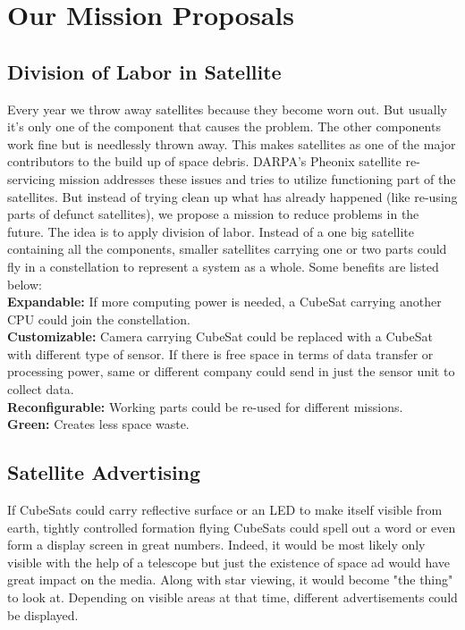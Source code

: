 \section{Our Mission Proposals}

\subsection{Division of Labor in Satellite}
\label{labour}
Every year we throw away satellites because they become worn out. But usually it's only one of the component that causes the problem. The other components work fine but is needlessly thrown away. This makes satellites as one of the major contributors to the build up of space debris. DARPA's Pheonix satellite re-servicing mission addresses these issues and tries to utilize functioning part of the satellites. But instead of trying clean up what has already happened (like  re-using parts of defunct satellites), we propose a mission to reduce problems in the future. The idea is to apply division of labor. Instead of a one big satellite containing all the components, smaller satellites carrying one or two parts could fly in a constellation to represent a system as a whole. Some benefits are listed below: \\

{\bf Expandable:} If more computing power is needed, a CubeSat carrying another CPU could join the constellation. \\
 
{\bf Customizable:} Camera carrying CubeSat could be replaced with a CubeSat with different type of sensor.
If there is free space in terms of data transfer or processing power, same or different company could send in just the sensor unit to collect data. \\

{\bf Reconfigurable:} Working parts could be re-used for different missions.\\

{\bf Green:} Creates less space waste.

\subsection{Satellite Advertising}
\label{ad}
If CubeSats could carry reflective surface or an LED to make itself visible from earth, tightly controlled formation flying CubeSats could spell out a word or even form a display screen in great numbers. Indeed, it would be most likely only visible with the help of a telescope but just the existence of space ad would have great impact on the media. Along with star viewing, it would become "the thing" to look at. Depending on visible areas at that time, different advertisements could be displayed.

